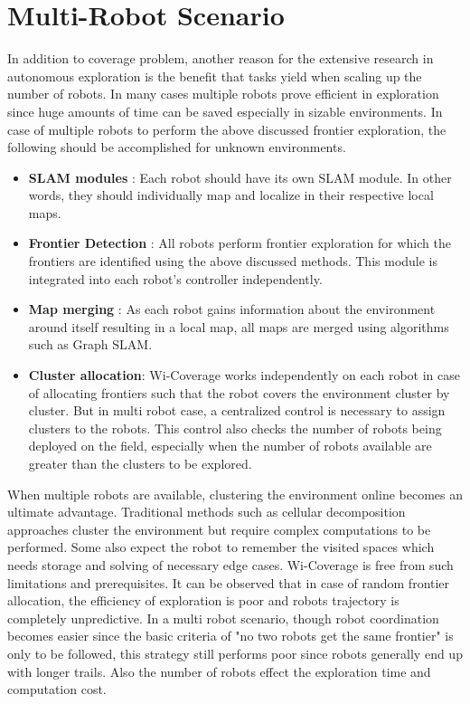 \section{Multi-Robot Scenario}
In addition to coverage problem, another reason for the extensive research in autonomous exploration is the benefit that tasks yield when scaling up the number of robots. In many cases multiple robots prove efficient in exploration since huge amounts of time can be saved especially in sizable environments. In case of multiple robots to perform the above discussed frontier exploration, the following should be accomplished for unknown environments.
\begin{itemize}
    \item \textbf{SLAM modules} : Each robot should have its own SLAM module. In other words, they should individually map and localize in their respective local maps.
    \item \textbf{Frontier Detection} : All robots perform frontier exploration for which the frontiers are identified using the above discussed methods. This module is integrated into each robot's controller independently. 
    \item \textbf{Map merging} : As each robot gains information about the environment around itself resulting in a local map, all maps are merged using algorithms such as Graph SLAM\cite{25}.
    \item \textbf{Cluster allocation}: Wi-Coverage works independently on each robot in case of allocating frontiers such that the robot covers the environment cluster by cluster. But in multi robot case, a centralized control is necessary to assign clusters to the robots. This control also checks the number of robots being deployed on the field, especially when the number of robots available are greater than the clusters to be explored.
\end{itemize}

\par When multiple robots are available, clustering the environment online becomes an ultimate advantage. Traditional methods such as cellular decomposition approaches cluster the environment but require complex computations to be performed. Some also expect the robot to remember the visited  spaces which needs storage and solving of necessary edge cases. Wi-Coverage is free from such limitations and prerequisites.      
It can be observed that in case of random frontier allocation, the efficiency of exploration is poor and robots trajectory is completely unpredictive. In a multi robot scenario, though robot coordination becomes easier since the basic criteria of "no two robots get the same frontier" is only to be followed, this strategy still performs poor since robots generally end up with longer trails. Also the number of robots effect the exploration time and computation cost.


